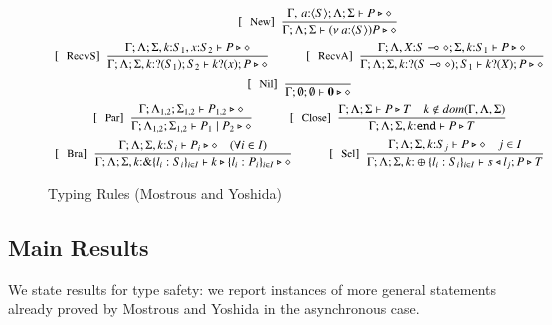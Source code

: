 \begin{figure}[!t]
\[\begin{array}{c}
	\qquad\quad 
	\jrule{\Gamma, \, a{:}\chtype{S} ; \Lambda; \Sigma \vdash P \hastype \Proc  }{\Gamma ; \Lambda; \Sigma \vdash \news{a{:}\chtype{S}} P \hastype \Proc}{New} 
	\vspace{2mm}
	\\
	\jrule{\Gamma ; \Lambda; \Sigma, k{:} S_1, x{:} S_2 \vdash P \hastype \Proc }{ \Gamma ; \Lambda; \Sigma, k{:}\btinp{S_1}S_2  \vdash \binp{k}{x}P \hastype \Proc}{RecvS}
	\qquad\quad 
	\jrule{\Gamma ; \Lambda, X{:} \lhot{S}; \Sigma, k{:} S_1  \vdash P \hastype \Proc }{ \Gamma ; \Lambda; \Sigma, k{:}\btinp{\lhot{S}}S_1  \vdash \binp{k}{X}P \hastype \Proc}{RecvA}
     \vspace{2mm}
	\\
	\jrule{}{\Gamma ; \emptyset; \emptyset \vdash \inact \hastype \Proc}{Nil}
     \vspace{2mm}
	\\
	\jrule{\Gamma ; \Lambda_{1,2}; \Sigma_{1,2} \vdash P_{1,2} \hastype \Proc}{\Gamma ; \Lambda_{1,2}; \Sigma_{1,2} \vdash P_1 \Par P_2 \hastype \Proc}{Par}
	 \qquad\quad  
	 \jrule{\Gamma ; \Lambda ; \Sigma  \vdash P \hastype T \quad k \not\in dom(\Gamma, \Lambda,\Sigma )}{\Gamma ; \Lambda ; \Sigma, k{:}\tinact  \vdash P \hastype T}{Close}
     \vspace{2mm}
	\\
	\jrule{\Gamma ; \Lambda ; \Sigma, k{:}S_i \vdash P_{i} \hastype \Proc \quad (\forall i \in I)}{\Gamma ; \Lambda ; \Sigma, k{:}\btbra{l_i:S_i}_{i \in I} \vdash \bbra{k}{l_i:P_i}_{i \in I}\hastype \Proc}{Bra}
	 \qquad\quad 
	 \jrule{\Gamma ; \Lambda ; \Sigma, k{:}S_j  \vdash P \hastype \Proc \quad j \in I}{\Gamma ; \Lambda ; \Sigma, k{:}\btsel{l_i:S_i}_{i \in I} \vdash \bsel{s}{l_j} P \hastype T}{Sel}
	\end{array}
\]
\caption{Typing Rules (Mostrous and Yoshida)\label{fig:typerulesmy}}
\end{figure}

\subsection{Main Results}
We state results for type safety: we report instances of more general statements already proved by Mostrous and Yoshida in the asynchronous case.

